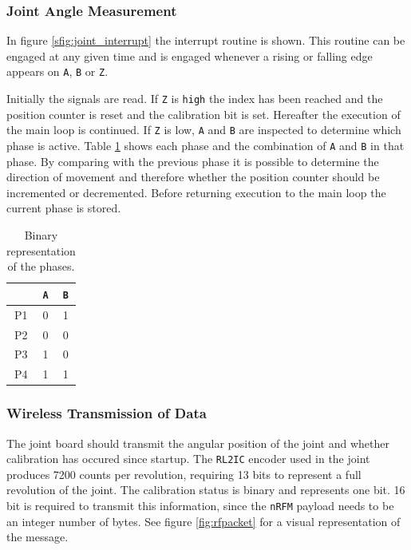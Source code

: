 \subsubsection{Joint Angle Measurement}
\label{ssub:joint_angle_measurement}
In figure \ref{sfig:joint_interrupt} the interrupt routine is shown.
This routine can be engaged at any given time and is engaged whenever a rising or falling edge appears on \texttt{A}, \texttt{B} or \texttt{Z}.

Initially the signals are read.
If \texttt{Z} is \texttt{high} the index has been reached and the position counter is reset and the calibration bit is set.
Hereafter the execution of the main loop is continued.
If \texttt{Z} is low, \texttt{A} and \texttt{B} are inspected to determine which phase is active.
Table \ref{tab:bin_phase} shows each phase and the combination of \texttt{A} and \texttt{B} in that phase.
By comparing with the previous phase it is possible to determine the direction of movement and therefore whether the position counter should be incremented or decremented.
Before returning execution to the main loop the current phase is stored. 

\begin{table}
	\centering
	\begin{tabular}{c | c  c}
		& \texttt{A} & \texttt{B}\\
		\hline
		P1 & 0 & 1\\
		P2 & 0 & 0\\
		P3 & 1 & 0\\
		P4 & 1 & 1
	\end{tabular}
	\caption{Binary representation of the phases.}
	\label{tab:bin_phase}
\end{table}

\subsubsection{Wireless Transmission of Data}
\label{ssub:wireless_transmission_of_data}
The joint board should transmit the angular position of the joint and whether calibration has occured since startup.
The \texttt{RL2IC} encoder used in the joint produces 7200 counts per revolution, requiring 13 bits to represent a full revolution of the joint.
The calibration status is binary and represents one bit. 
16 bit is required to transmit this information, since the \texttt{nRFM} payload needs to be an integer number of bytes.
See figure \ref{fig:rfpacket} for a visual representation of the message.

